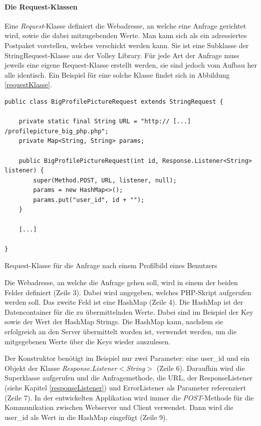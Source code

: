\documentclass[../main.tex]{subfiles}
\begin{document}
	\paragraph{Die Request-Klassen}
	Eine \emph{Request}-Klasse definiert die Webadresse, an welche eine Anfrage gerichtet wird, sowie die dabei mitzugebenden Werte. Man kann sich als ein adressiertes Postpaket vorstellen, welches verschickt werden kann. Sie ist eine Subklasse der StringRequest-Klasse aus der Volley Library. Für jede Art der Anfrage muss jeweils eine eigene Request-Klasse erstellt werden, sie sind jedoch vom Aufbau her alle identisch. Ein Beispiel für eine solche Klasse findet sich in Abbildung \ref{requestKlasse}.
	
\begin{code}
	\begin{center}
		\begin{verbatim}
public class BigProfilePictureRequest extends StringRequest {

	private static final String URL = "http:// [...] /profilepicture_big_php.php";
	private Map<String, String> params;

	public BigProfilePictureRequest(int id, Response.Listener<String> listener) {
		super(Method.POST, URL, listener, null);
		params = new HashMap<>();
		params.put("user_id", id + "");
	}

	[...]
	
}
		\end{verbatim}
		\caption{Request-Klasse für die Anfrage nach einem Profilbild eines Benutzers}
		\label{requestKlasse}
	\end{center}
\end{code}

	Die Webadresse, an welche die Anfrage gehen soll, wird in einem der beiden Felder definiert (Zeile 3). Dabei wird angegeben, welches PHP-Skript aufgerufen werden soll. Das zweite Feld ist eine HashMap (Zeile 4). Die HashMap ist der Datencontainer für die zu übermittelnden Werte. Dabei sind im Beispiel der Key sowie der Wert der HashMap Strings. Die HashMap kann, nachdem sie erfolgreich an den Server übermittelt worden ist, verwendet werden, um die mitgegebenen Werte über die Keys wieder auszulesen.
	
	Der Konstruktor benötigt im Beispiel nur zwei Parameter: eine user\_id und ein Objekt der Klasse \emph{Response.Listener$<$String$>$} (Zeile 6). Daraufhin wird die Superklasse aufgerufen und die Anfragemethode, die URL, der ResponseListener (siehe Kapitel \ref{responseListener}) und ErrorListener als Parameter referenziert (Zeile 7). In der entwickelten Applikation wird immer die \emph{POST}-Methode für die Kommunikation zwischen Webserver und Client verwendet. Dann wird die user\_id als Wert in die HashMap eingefügt (Zeile 9).
	
\end{document}

